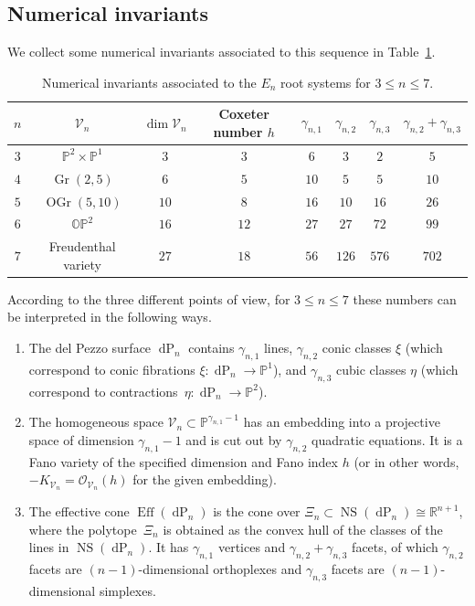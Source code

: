 \documentclass[10pt,a4paper]{amsart}
\numberwithin{equation}{section}
\theoremstyle{definition}
\newcommand{\PP}{\mathbb{P}}
\newcommand{\RR}{\mathbb{R}}
\DeclareMathOperator{\Gr}{Gr}
\DeclareMathOperator{\OGr}{OGr}
\DeclareMathOperator{\NS}{NS}
\DeclareMathOperator{\dP}{dP}
\begin{document}
\subsection{Numerical invariants} \label{sect!numerical}
We collect some numerical invariants associated to this sequence in Table~\ref{table!En}.
\begin{table}[htp]
\centering\renewcommand{\arraystretch}{1.2}
\begin{tabular}{|c|c|c|c|cccc|}\hline
$n$ & $\mathcal V_n$ 			& $\dim \mathcal V_n$ & Coxeter number $h$ 	& $\gamma_{n,1}$& $\gamma_{n,2}$& $\gamma_{n,3}$& $\gamma_{n,2}+\gamma_{n,3}$ \\ \hline
$3$ & $\PP^2\times\PP^1$	& $3$	& $3$		& $6$		& $3$		& $2$ & $5$ \\
$4$ & $\Gr(2,5)$		& $6$	& $5$		& $10$		& $5$		& $5$ & $10$ \\
$5$ & $\OGr(5,10)$		& $10$	& $8$		& $16$		& $10$		& $16$ & $26$ \\
$6$ & $\mathbb{OP}^2$	& $16$	& $12$		& $27$		& $27$		& $72$ & $99$ \\
$7$ & Freudenthal variety	& $27$ & $18$	& $56$		& $126$		& $576$ & $702$ \\ \hline
\end{tabular}
\caption{Numerical invariants associated to the $E_n$ root systems for $3\leq n\leq 7$.}\label{table!En}
\end{table}

According to the three different points of view, for $3\leq n\leq 7$ these numbers can be interpreted in the following ways.
\begin{enumerate}\itemsep=0pt
\item[(1)] The del Pezzo surface $\dP_n$ contains $\gamma_{n,1}$ lines, $\gamma_{n,2}$ conic classes $\xi$ \big(which correspond to conic fibrations $\xi\colon\dP_n\to \PP^1$\big), and $\gamma_{n,3}$ cubic classes $\eta$ \big(which correspond to contractions~${\eta\colon\dP_n\to \PP^2}$\big).
\item[(2)] The homogeneous space $\mathcal V_n\subset\PP^{\gamma_{n,1}-1}$ has an embedding into a projective space of dimension $\gamma_{n,1}-1$ and is cut out by $\gamma_{n,2}$ quadratic equations. It is a Fano variety of the specified dimension and Fano index $h$ (or in other words, $-K_{\mathcal V_n}=\mathcal{O}_{\mathcal V_n}(h)$ for the given embedding).
\item[(3)] The effective cone $\operatorname{Eff}(\dP_n)$ is the cone over $\Xi_n\subset \NS(\dP_n)\cong \RR^{n+1}$, where the polytope~$\Xi_n$ is obtained as the convex hull of the classes of the lines in $\NS(\dP_n)$. It has $\gamma_{n,1}$ vertices and $\gamma_{n,2}+\gamma_{n,3}$ facets, of which $\gamma_{n,2}$ facets are $(n-1)$-dimensional orthoplexes and $\gamma_{n,3}$ facets are $(n-1)$-dimensional simplexes.
\end{enumerate}
\end{document}
